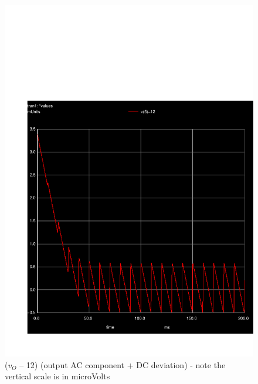 \par
\begin{figure}[H] \centering
\includegraphics[width=0.6\linewidth]{vo_menos_12.pdf}
\caption{($v_O$ – 12) (output AC component + DC deviation) - note the vertical scale is in microVolts}
\label{fig:deviation}
\end{figure}

\pagebreak
